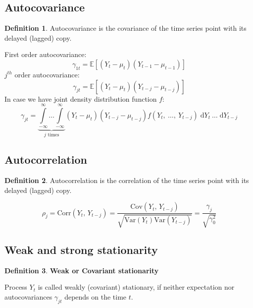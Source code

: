 \documentclass[12pt, english]{article}
\numberwithin{equation}{section} %
\theoremstyle{plain}
\theoremstyle{definition}
\newtheorem{definition}{Definition}[subsection]
\newcommand{\dd}{\;\mathrm{d}}
\begin{document}
\subsection{Autocovariance}
\begin{definition}
	Autocovariance is the covariance of the time series point with its delayed (lagged) copy.
\end{definition}
First order autocovariance:
\begin{equation}
	\gamma_{1t} = \mathbb{E} \left[ (Y_t - \mu_t)(Y_{t-1} - \mu_{t-1}) \right]
\end{equation}
$j^{th}$ order autocovariance:
\begin{equation}
	\gamma_{jt} = \mathbb{E} \left[ (Y_t - \mu_t)(Y_{t-j} - \mu_{t-j}) \right]
\end{equation}
In case we have joint density distribution function $f$:
\begin{equation}
	\gamma_{jt} = \underbrace{\int\limits_{-\infty}^{\infty} \dots \int\limits_{-\infty}^{\infty}}_{j \text{ times}} (Y_t - \mu_t) (Y_{t-j} - \mu_{t-j}) f(Y_t,\ \dots,\ Y_{t-j}) \dd Y_t \ \dots \dd Y_{t-j}
\end{equation}

\subsection{Autocorrelation}
\begin{definition}
	Autocorrelation is the correlation of the time series point with its delayed (lagged) copy.
\end{definition}
\begin{equation}
	\rho_j = \text{Corr}(Y_t,\, Y_{t-j}) = \frac{\text{Cov}(Y_t,\, Y_{t-j})}{\sqrt{\text{Var}(Y_t) \text{Var}(Y_{t-j})}} = \frac{\gamma_j}{\sqrt{\gamma_0^2}}
\end{equation}

\subsection{Weak and strong stationarity}
\begin{definition}
	\label{weak_stationarity}
	\textbf{Weak or Covariant stationarity}
	
	Process $Y_t$ is called weakly (covariant) stationary, if neither expectation nor autocovariances $\gamma_{jt}$ depends on the time $t$.
\end{definition}
\end{document}
